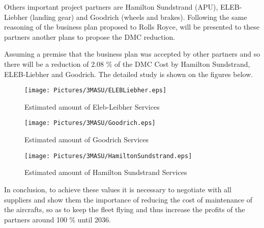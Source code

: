 Others important project partners are Hamilton Sundstrand (APU), ELEB-Liebher (landing gear) and  Goodrich (wheels and brakes). Following the same reasoning of the business plan proposed to Rolls Royce, will be presented to these partners another plans to propose the DMC reduction.

Assuming a premise that the business plan was accepted by other partners and so there will be a reduction of 2.08 \% of the DMC Cost by Hamilton Sundstrand, ELEB-Liebher and Goodrich. The detailed study is shown on the figures below.

\begin{figure}[H]
	\centering
	\texttt{[image: Pictures/3MASU/ELEBLiebher.eps]}
	\caption{Estimated amount of Eleb-Leibher Services}
	\label{fig:ELEBLiebher}
\end{figure}

\begin{figure}[H]
	\centering
	\texttt{[image: Pictures/3MASU/Goodrich.eps]}
	\caption{Estimated amount of Goodrich Services}
	\label{fig:Goodrich}
\end{figure}

\begin{figure}[H]
	\centering
	\texttt{[image: Pictures/3MASU/HamiltonSundstrand.eps]}
	\caption{Estimated amount of Hamilton Sundstrand Services}
	\label{fig:HamiltonSundstrand}
\end{figure}

In conclusion, to achieve these values it is necessary to negotiate with all suppliers and show them the importance of reducing the cost of maintenance of the aircrafts, so as to keep the fleet flying and thus increase the profits of the partners around 100 \% until 2036.
